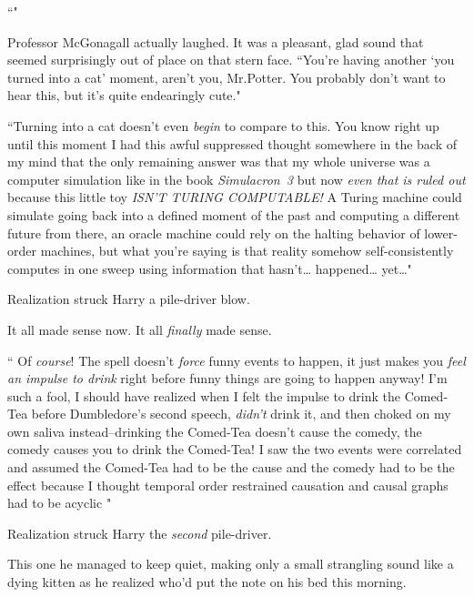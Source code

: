 ``"

Professor McGonagall actually laughed. It was a pleasant, glad sound that seemed surprisingly out of place on that stern face. ``You're having another `you turned into a cat' moment, aren't you, Mr.\?Potter. You probably don't want to hear this, but it's quite endearingly cute."

``Turning into a cat doesn't even \emph{begin} to compare to this. You know right up until this moment I had this awful suppressed thought somewhere in the back of my mind that the only remaining answer was that my whole universe was a computer simulation like in the book \emph{Simulacron~3} but now \emph{even that is ruled out} because this little toy \emph{ISN'T TURING COMPUTABLE!} A Turing machine could simulate going back into a defined moment of the past and computing a different future from there, an oracle machine could rely on the halting behavior of lower-order machines, but what you're saying is that reality somehow self-consistently computes in one sweep using information that hasn't{\ldots} happened{\ldots} yet{\ldots}"

Realization struck Harry a pile-driver blow.

It all made sense now. It all \emph{finally} made sense.

`` Of \emph{course}! The spell doesn't \emph{force} funny events to happen, it just makes you \emph{feel an impulse to drink} right before funny things are going to happen anyway! I'm such a fool, I should have realized when I felt the impulse to drink the Comed-Tea before Dumbledore's second speech, \emph{didn't} drink it, and then choked on my own saliva instead\---drinking the Comed-Tea doesn't cause the comedy, the comedy causes you to drink the Comed-Tea! I saw the two events were correlated and assumed the Comed-Tea had to be the cause and the comedy had to be the effect because I thought temporal order restrained causation and causal graphs had to be acyclic "

Realization struck Harry the \emph{second} pile-driver.

This one he managed to keep quiet, making only a small strangling sound like a dying kitten as he realized who'd put the note on his bed this morning.

